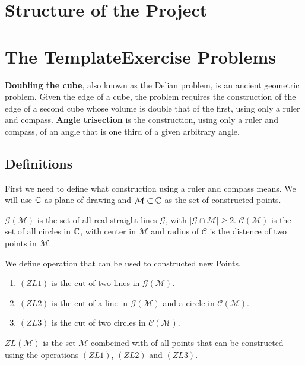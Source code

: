 \documentclass{../Proof_layout_PDF/TemplateExercise}
\begin{document}
\section{Structure of the Project}


\section{The TemplateExercise Problems}
\textbf{Doubling the cube}, also known as the Delian problem, is an ancient geometric problem.
Given the edge of a cube, the problem requires the construction of the edge of a second cube whose volume is double that of the first,
using only a ruler and compass.
\newline
\textbf{Angle trisection} is the construction, using only a ruler and compass, of an angle that is one third of a given arbitrary angle.

\subsection{Definitions}
First we need to define what construction using a ruler and compass means.
We will use $\mathbb{C}$ as plane of drawing and $\mathcal{M} \subset \mathbb{C}$ as the set of constructed points.
\begin{definition}
    $\mathcal{G(M)}$ is the set of all real straight lines $\mathcal{G}$, with $| \mathcal{G} \cap \mathcal{M} |\ge 2$.\newline
    $\mathcal{C(M)}$ is the set of all circles in $\mathbb{C}$, with center in $\mathcal{M}$ and radius of $\mathcal{C}$ is the distence of two points in $\mathcal{M}$.
\end{definition}

\begin{definition}
    We define operation that can be used to constructed new Points.
    \begin{enumerate}
        \item $(ZL 1)$ is the cut of two lines in $\mathcal{G(M)}$.
        \item $(ZL 2)$ is the cut of a line in $\mathcal{G(M)}$ and a circle in $\mathcal{C(M)}$. \newline
        \item $(ZL 3)$ is the cut of two circles in $\mathcal{C(M)}$.\newline
    \end{enumerate}
    $ZL(\mathcal{M})$ is the set $\mathcal{M}$ combeined with of all points that can be constructed using the operations $(ZL 1)$, $(ZL 2)$ and $(ZL 3)$.
\end{definition}
\end{document}
